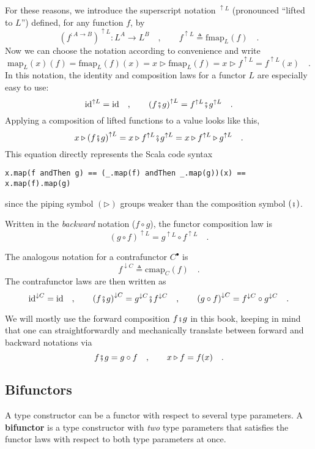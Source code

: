 For these reasons, we introduce the superscript notation $^{\uparrow L}$
(pronounced \textsf{``}lifted to $L$\textsf{''}) defined, for any function $f$,
by
\[
(f^{:A\rightarrow B})^{\uparrow L}:L^{A}\rightarrow L^{B}\quad,\quad\quad f^{\uparrow L}\triangleq\text{fmap}_{L}(f)\quad.
\]
Now we can choose the notation according to convenience and write
\[
\text{map}_{L}(x)(f)=\text{fmap}_{L}(f)(x)=x\triangleright\text{fmap}_{L}(f)=x\triangleright f^{\uparrow L}=f^{\uparrow L}(x)\quad.
\]
In this notation, the identity and composition laws for a functor
$L$ are especially easy to use:
\[
\text{id}^{\uparrow L}=\text{id}\quad,\quad\quad\left(f\bef g\right)^{\uparrow L}=f^{\uparrow L}\bef g^{\uparrow L}\quad.
\]
Applying a composition of lifted functions to a value looks like this,
\[
x\triangleright\left(f\bef g\right)^{\uparrow L}=x\triangleright f^{\uparrow L}\bef g^{\uparrow L}=x\triangleright f^{\uparrow L}\triangleright g^{\uparrow L}\quad.
\]
This equation directly represents the Scala code syntax
\begin{lstlisting}
x.map(f andThen g) == (_.map(f) andThen _.map(g))(x) == x.map(f).map(g)
\end{lstlisting}
since the piping symbol $\left(\triangleright\right)$ groups weaker
than the composition symbol $\left(\bef\right)$.

Written in the \emph{backward} notation ($f\circ g$), the functor
composition law is
\[
\left(g\circ f\right)^{\uparrow L}=g^{\uparrow L}\circ f^{\uparrow L}\quad.
\]

The analogous notation for a contrafunctor $C^{\bullet}$ is
\[
f^{\downarrow C}\triangleq\text{cmap}_{C}(f)\quad.
\]
The contrafunctor laws are then written as
\[
\text{id}^{\downarrow C}=\text{id}\quad,\quad\quad\left(f\bef g\right)^{\downarrow C}=g^{\downarrow C}\bef f^{\downarrow C}\quad,\quad\quad\left(g\circ f\right)^{\downarrow C}=f^{\downarrow C}\circ g^{\downarrow C}\quad.
\]

We will mostly use the forward composition $f\bef g$ in this book,
keeping in mind that one can straightforwardly and mechanically translate
between forward and backward notations via 
\[
f\bef g=g\circ f\quad,\quad\quad x\triangleright f=f(x)\quad.
\]


\subsection{Bifunctors\label{subsec:Bifunctors}}

A type constructor can be a functor with respect to several type parameters.
A \textbf{bifunctor} is a type constructor with
\emph{two} type parameters that satisfies the functor laws with respect
to both type parameters at once.

